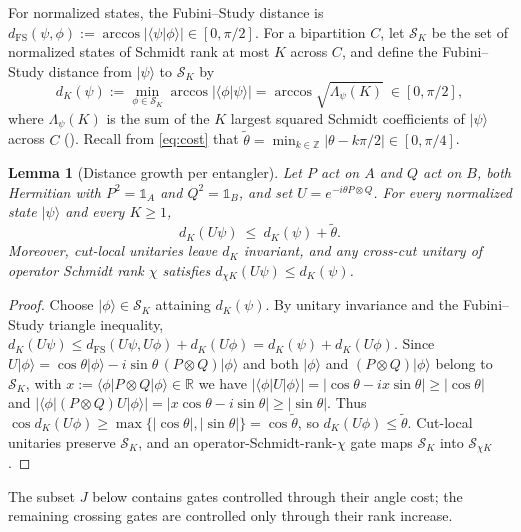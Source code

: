 \documentclass[reprint,aps,pra,floatfix,superscriptaddress,nofootinbib,longbibliography]{revtex4-2}
\newtheorem{lemma}[theorem]{Lemma}
\theoremstyle{remark}
\theoremstyle{definition}
\newcommand{\calS}{\mathcal{S}}
\newcommand{\ket}[1]{\lvert #1 \rangle}
\newcommand{\bra}[1]{\langle #1 \rvert}
\newcommand{\braket}[2]{\langle #1 \vert #2 \rangle}
\begin{document}
For normalized states, the Fubini--Study distance is
$d_{\mathrm{FS}}(\psi,\phi):=\arccos|\braket{\psi}{\phi}|\in[0,\pi/2]$. For a
bipartition $C$, let $\calS_K$ be the set of normalized states of Schmidt rank at
most $K$ across $C$, and define the Fubini--Study distance from $\ket{\psi}$ to
$\calS_K$ by
\begin{equation}
  \label{eq:dK}
  d_K(\psi):=\min_{\phi\in\calS_K}\arccos|\braket{\phi}{\psi}|
  =\arccos\sqrt{\Lambda_\psi(K)}\ \in[0,\pi/2],
\end{equation}
where $\Lambda_\psi(K)$ is the sum of the $K$ largest squared Schmidt
coefficients of $\ket{\psi}$ across $C$ (). Recall from
\eqref{eq:cost} that $\tilde\theta=\min_{k\in\mathbb{Z}}|\theta-k\pi/2|\in[0,\pi/4]$.

\begin{lemma}[Distance growth per entangler]
\label{lem:distance}
Let $P$ act on $A$ and $Q$ act on $B$, both Hermitian with $P^2=\mathbb{1}_A$
and $Q^2=\mathbb{1}_B$, and set $U=e^{-i\theta P\otimes Q}$. For every normalized
state $\ket{\psi}$ and every $K\ge1$,
\begin{equation}
  d_K(U\psi)\ \le\ d_K(\psi)+\tilde\theta .
\end{equation}
Moreover, cut-local unitaries leave $d_K$ invariant, and any cross-cut unitary of
operator Schmidt rank $\chi$ satisfies $d_{\chi K}(U\psi)\le d_K(\psi)$.
\end{lemma}

\begin{proof}
Choose $\ket{\phi}\in\calS_K$ attaining $d_K(\psi)$. By unitary invariance and
the Fubini--Study triangle inequality,
$d_K(U\psi)\le d_{\mathrm{FS}}(U\psi,U\phi)+d_K(U\phi)=d_K(\psi)+d_K(U\phi)$.
Since $U\ket{\phi}=\cos\theta\ket{\phi}-i\sin\theta\,(P\otimes Q)\ket{\phi}$ and
both $\ket{\phi}$ and $(P\otimes Q)\ket{\phi}$ belong to $\calS_K$, with
$x:=\bra{\phi}P\otimes Q\ket{\phi}\in\mathbb{R}$ we have
$|\bra{\phi}U\ket{\phi}|=|\cos\theta-ix\sin\theta|\ge|\cos\theta|$ and
$|\bra{\phi}(P\otimes Q)U\ket{\phi}|=|x\cos\theta-i\sin\theta|\ge|\sin\theta|$.
Thus $\cos d_K(U\phi)\ge\max\{|\cos\theta|,|\sin\theta|\}=\cos\tilde\theta$, so
$d_K(U\phi)\le\tilde\theta$. Cut-local unitaries preserve $\calS_K$, and an
operator-Schmidt-rank-$\chi$ gate maps $\calS_K$ into $\calS_{\chi K}$.
\end{proof}

The subset $J$ below contains gates controlled through their angle cost; the
remaining crossing gates are controlled only through their rank increase.
\end{document}
